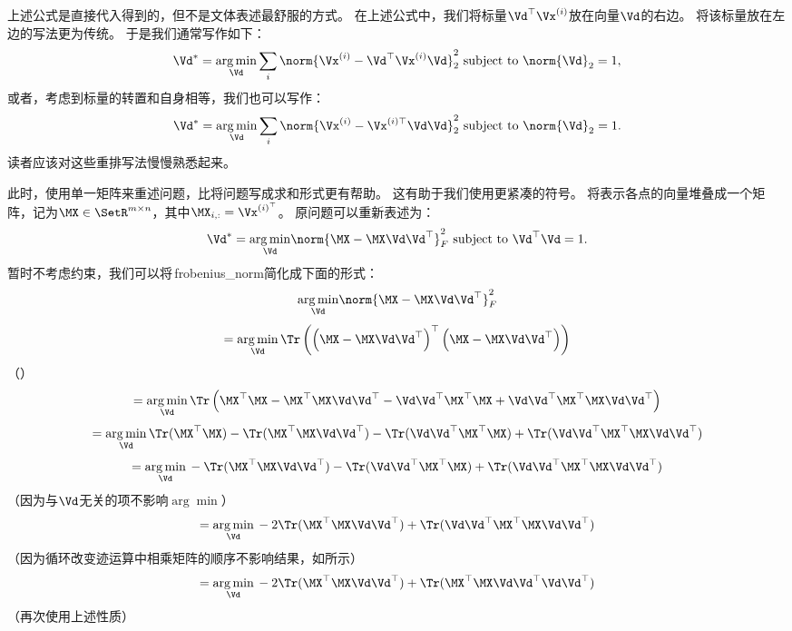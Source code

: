 
上述公式是直接代入得到的，但不是文体表述最舒服的方式。
在上述公式中，我们将标量$\Vd^\top\Vx^{(i)}$放在向量$\Vd$的右边。
将该标量放在左边的写法更为传统。
于是我们通常写作如下：
\begin{equation}
    \Vd^* = \underset{\Vd}{\arg\min} \sum_i \norm{\Vx^{(i)} - \Vd^\top \Vx^{(i)}\Vd}_2^2
        \text{ subject to } \norm{\Vd}_2 = 1,
\end{equation}
或者，考虑到标量的转置和自身相等，我们也可以写作：
\begin{equation}
    \Vd^* = \underset{\Vd}{\arg\min} \sum_i \norm{\Vx^{(i)} - \Vx^{(i)\top}\Vd\Vd}_2^2
        \text{ subject to } \norm{\Vd}_2 = 1.
\end{equation}
读者应该对这些重排写法慢慢熟悉起来。


此时，使用单一矩阵来重述问题，比将问题写成求和形式更有帮助。
这有助于我们使用更紧凑的符号。
将表示各点的向量堆叠成一个矩阵，记为$\MX\in\SetR^{m\times n}$，其中$\MX_{i,:}=\Vx^{(i)^\top}$。
原问题可以重新表述为：
\begin{equation}
    \Vd^* = \underset{\Vd}{\arg\min} \norm{\MX - \MX\Vd\Vd^\top}_F^2
        \text{ subject to } \Vd^\top \Vd = 1.
\end{equation}
暂时不考虑约束，我们可以将\,\gls{frobenius_norm}简化成下面的形式：
\begin{equation}
     \underset{\Vd}{\arg\min} \norm{\MX - \MX \Vd\Vd^\top}_F^2
\end{equation}
\begin{equation}
    = \underset{\Vd}{\arg\min} \, \Tr \left( \left( \MX - \MX \Vd\Vd^\top  \right)^\top \left( \MX - \MX \Vd\Vd^\top  \right) \right)
\end{equation}
（）
\begin{equation}
    = \underset{\Vd}{\arg\min} \, \Tr \left( \MX^\top\MX - \MX^\top\MX \Vd\Vd^\top - \Vd\Vd^\top \MX^\top\MX + \Vd\Vd^\top \MX^\top\MX\Vd\Vd^\top  \right)
\end{equation}
\begin{equation}
    = \underset{\Vd}{\arg\min} \, \Tr( \MX^\top\MX)  - \Tr(\MX^\top\MX \Vd\Vd^\top)  - \Tr(\Vd\Vd^\top \MX^\top\MX) + \Tr(\Vd\Vd^\top \MX^\top\MX\Vd\Vd^\top)
\end{equation}
\begin{equation}
    = \underset{\Vd}{\arg\min} \, - \Tr(\MX^\top\MX \Vd\Vd^\top)  - \Tr(\Vd\Vd^\top \MX^\top\MX) + \Tr(\Vd\Vd^\top \MX^\top\MX\Vd\Vd^\top)
\end{equation}
（因为与$\Vd$无关的项不影响$\arg\min$）
\begin{equation}
    = \underset{\Vd}{\arg\min} \, - 2\Tr(\MX^\top\MX \Vd\Vd^\top) + \Tr(\Vd\Vd^\top \MX^\top\MX\Vd\Vd^\top)
\end{equation}
（因为循环改变迹运算中相乘矩阵的顺序不影响结果，如所示）
\begin{equation}
    = \underset{\Vd}{\arg\min} \, - 2\Tr(\MX^\top\MX \Vd\Vd^\top) + \Tr(\MX^\top\MX\Vd\Vd^\top\Vd\Vd^\top )
\end{equation}
（再次使用上述性质）

